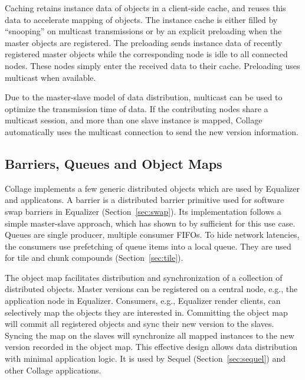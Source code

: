 \documentclass[10pt,journal,compsoc]{IEEEtran}
\newcommand{\sref}[1]{Section~\ref{#1}}
\begin{document}
Caching retains instance data of objects in a client-side cache, and reuses this
data to accelerate mapping of objects. The instance cache is either filled by
``snooping'' on multicast transmissions or by an explicit preloading when the
master objects are registered. The preloading sends instance data of recently
registered master objects while the corresponding node is idle to all connected
nodes. These nodes simply enter the received data to their cache. Preloading
uses multicast when available.

Due to the master-slave model of data distribution, multicast can be used to
optimize the transmission time of data. If the contributing nodes share a
multicast session, and more than one slave instance is mapped, \textsf{Collage}
automatically uses the multicast connection to send the new version
information.

\subsection{Barriers, Queues and Object Maps}\label{sec:barrier}

\textsf{Collage} implements a few generic distributed objects which are used by
\textsf{Equalizer}
and applicatons. A barrier is a distributed barrier primitive used for software
swap barriers in \textsf{Equalizer} (\sref{sec:swap}). Its implementation
follows a
simple master-slave approach, which has shown to by sufficient for this use
case. Queues are single producer, multiple consumer FIFOs. To hide network
latencies, the consumers use prefetching of queue items into a local queue. They
are used for tile and chunk compounds (\sref{sec:tile}).

The object map facilitates distribution and synchronization of a collection of
distributed objects. Master versions can be registered on a central node, e.g.,
the application node in \textsf{Equalizer}. Consumers, e.g., \textsf{Equalizer}
render clients,
can selectively map the objects they are interested in. Committing the object
map will commit all registered objects and sync their new version to the
slaves. Syncing the map on the slaves will synchronize all mapped instances to
the new version recorded in the object map. This effective design allows data
distribution with minimal application logic. It is used by \textsf{Sequel}
(\sref{sec:sequel}) and other \textsf{Collage} applications.

\end{document}
